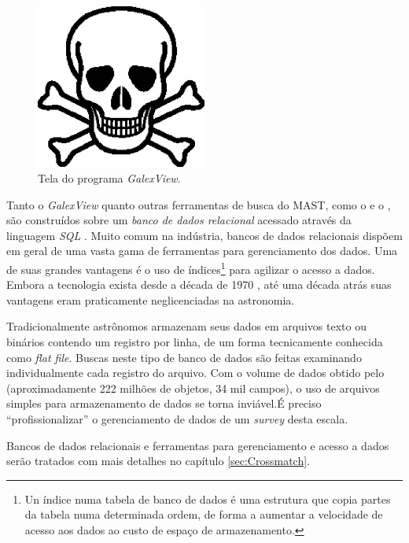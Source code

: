 \begin{figure}
	\includegraphics[width=0.5\textwidth]{figuras/test.eps}
	\caption[Tela do programa{\em GalexView}.]
	{Tela do programa {\em GalexView}.}
	\label{fig:GalexView}
\end{figure}

Tanto o {\em GalexView} quanto outras ferramentas de busca do MAST, como o
 e o , são construídos sobre um
{\em banco de dados relacional} acessado através da linguagem {\em SQL}
\citep{Chamberlin1974}. Muito comum na indústria, bancos de dados relacionais
dispõem em geral de uma vasta gama de ferramentas para gerenciamento dos dados.
Uma de suas grandes vantagens é o uso de índices\footnote{Un índice numa tabela
de banco de dados é uma estrutura que copia partes da tabela numa determinada
ordem, de forma a aumentar a velocidade de acesso aos dados ao custo de espaço
de armazenamento.} para agilizar o acesso a dados. Embora a tecnologia exista
desde a década de 1970 \citep{Codd1970}, até uma década atrás suas vantagens
eram praticamente neglicenciadas na astronomia.

Tradicionalmente astrônomos armazenam seus dados em arquivos texto ou binários
contendo um registro por linha, de um forma tecnicamente conhecida como {\em
flat file}. Buscas neste tipo de banco de dados são feitas examinando
individualmente cada registro do arquivo. Com o volume de dados obtido pelo
\galex (aproximadamente 222 milhões de objetos, 34 mil campos)\citneed, o uso de
arquivos simples para armazenamento de dados se torna inviável.\citneed É
preciso ``profissionalizar'' o gerenciamento de dados de um {\em survey} desta
escala.

Bancos de dados relacionais e ferramentas para gerenciamento e acesso a dados
serão tratados com mais detalhes no capítulo \ref{sec:Crossmatch}.


